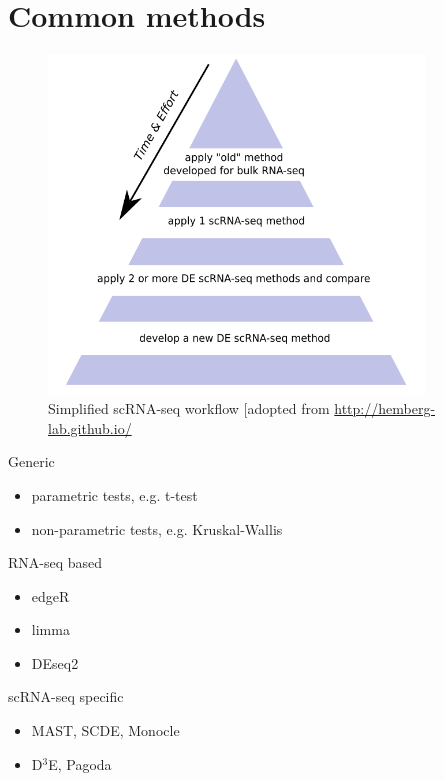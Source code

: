 \documentclass{beamer}\usepackage[]{graphicx}\usepackage[]{color}
\begin{document}
\section{Common methods}
\begin{frame}
\begin{center}
\insertsection
\end{center}
\end{frame}

\begin{frame}
\begin{center}
\begin{figure}
\includegraphics[width=10cm]{Images/solutionTriangle.png}
\caption{Simplified scRNA-seq workflow [adopted from \href{http://hemberg-lab.github.io/]}{http://hemberg-lab.github.io/}}
\end{figure}
\end{center}
\end{frame}

\begin{frame}
\begin{block}{Generic}
\begin{itemize}
  \item parametric tests, e.g. t-test
  \item non-parametric tests, e.g. Kruskal-Wallis
\end{itemize}
\end{block}
\begin{block}{RNA-seq based}
\begin{itemize}
  \item edgeR
  \item limma
  \item DEseq2 
\end{itemize}
\end{block}
\begin{block}{scRNA-seq specific}
\begin{itemize}
  \item MAST, SCDE, Monocle
  \item D$^3$E, Pagoda
 \end{itemize}
\end{block}
\end{frame}
\end{document}

